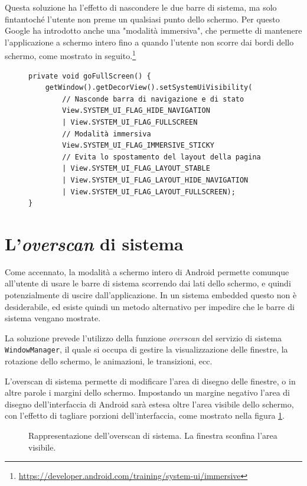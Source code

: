 Questa soluzione ha l'effetto di nascondere le due barre di sistema, ma solo fintantoché l'utente non preme un qualsiasi punto dello schermo. Per questo Google ha introdotto anche una "modalità immersiva", che permette di mantenere l'applicazione a schermo intero fino a quando l'utente non scorre dai bordi dello schermo, come mostrato in seguito.\footnote{\url{https://developer.android.com/training/system-ui/immersive}}

\begin{figure}
\begin{verbatim}
private void goFullScreen() {
    getWindow().getDecorView().setSystemUiVisibility(
        // Nasconde barra di navigazione e di stato
        View.SYSTEM_UI_FLAG_HIDE_NAVIGATION
        | View.SYSTEM_UI_FLAG_FULLSCREEN
        // Modalità immersiva
        View.SYSTEM_UI_FLAG_IMMERSIVE_STICKY
        // Evita lo spostamento del layout della pagina
        | View.SYSTEM_UI_FLAG_LAYOUT_STABLE
        | View.SYSTEM_UI_FLAG_LAYOUT_HIDE_NAVIGATION
        | View.SYSTEM_UI_FLAG_LAYOUT_FULLSCREEN);
}
\end{verbatim}
\end{figure}


\section{L'\emph{overscan} di sistema}
\label{sec:kiosk_overscan}

Come accennato, la modalità a schermo intero di Android permette comunque all'utente di usare le barre di sistema scorrendo dai lati dello schermo, e quindi potenzialmente di uscire dall'applicazione. In un sistema embedded questo non è desiderabile, ed esiste quindi un metodo alternativo per impedire che le barre di sistema vengano mostrate.

La soluzione prevede l'utilizzo della funzione \emph{overscan} del servizio di sistema \texttt{WindowManager}, il quale si occupa di gestire la visualizzazione delle finestre, la rotazione dello schermo, le animazioni, le transizioni, ecc.

L'overscan di sistema permette di modificare l'area di disegno delle finestre, o in altre parole i margini dello schermo. Impostando un margine negativo l'area di disegno dell'interfaccia di Android sarà estesa oltre l'area visibile dello schermo, con l'effetto di tagliare porzioni dell'interfaccia, come mostrato nella figura \ref{fig:overscan}.

\begin{figure}[h]
	\centering
	
	\scalebox{0.5} {
	}

	\caption{Rappresentazione dell'overscan di sistema. La finestra sconfina l'area visibile.}
	\label{fig:overscan}
\end{figure}

